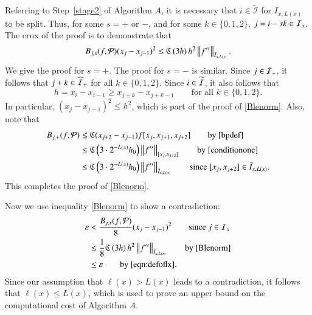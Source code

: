 \documentclass[review]{elsarticle}
\newcommand{\abstol}{\varepsilon}
\theoremstyle{definition}
\begin{document}
Referring to Step~\ref{stage2} of Algorithm $A$, it is necessary that $i \in \widetilde{\mathcal{I}}$ for $I_{x,L(x)}$ to be split.  Thus, for some $s =+$ or $-$, and for some $k \in \{0,1,2\}$, $j = i  - sk \in \ci_s$.   The crux of the proof is to demonstrate that
\begin{equation} \label{Blenorm}
B_{j,s}(f,\cp)(x_j-x_{j-1})^2 \le  \fC\left(3h\right) h^2  \norm[\bar{I}_{x,L(x)}]{f''}.
\end{equation}
We give the proof for  $s =+$.  The proof for $s= -$ is similar.  Since $j \in \ci_+$, it follows that $j + k \in \widehat{\ci}_+$ for all $k \in \{0,1,2\}$. Since $i \in \widetilde{\ci}$, it also follows that
\begin{equation} \label{conditionone}
h = x_{i} - x_{i-1} \ge x_{j+k} - x_{j+k-1} \qquad \text{for all } k \in \{0,1,2\}.
\end{equation}
In particular, $(x_j-x_{j-1})^2 \le h^2$, which is part of the proof of \eqref{Blenorm}.  Also, note that
  \begin{align*}
  B_{j,+}(f,\cp)
  & \le \fC(x_{j+2}-x_{j-1})f[x_{j},x_{j+1},x_{j+2}] \qquad \text{by}~\eqref{bpdef} \\
  &\le  \fC\left(3\cdot2^{-L(x)}h_0\right) \norm[{[x_{j},x_{j+2}]}]{f''} \qquad \text{by}~\eqref{conditionone} \\
  & \le   \fC\left(3\cdot2^{-L(x)}h_0\right)  \norm[\bar{I}_{x,L(x)}]{f''}  \qquad \text{since}~[x_{j},x_{j+2}] \in \bar{I}_{x,L(x)} .
  \end{align*}
This completes the proof of  \eqref{Blenorm}.

Now we use inequality \eqref{Blenorm} to show a contradiction:
 \begin{align*}
 \abstol & <  \frac{B_{j,s}(f,\cp)}{8}(x_j-x_{j-1})^2 \qquad \text{since}~j \in \ci_s\\
 & \le   \frac 1 8 \fC\left(3h\right) h^2  \norm[\bar{I}_{x,L(x)}]{f''}  \qquad \text{by}~\eqref{Blenorm} \\
 & \le    \abstol \qquad \text{by}~\eqref{eqn:defoflx} .
 \end{align*}
 Since our assumption that $\ell(x) > L(x)$ leads to a contradiction, it follows that $\ell(x) \le  L(x)$, which is used to prove an upper bound on the computational cost of Algorithm $A$.
\end{document}
